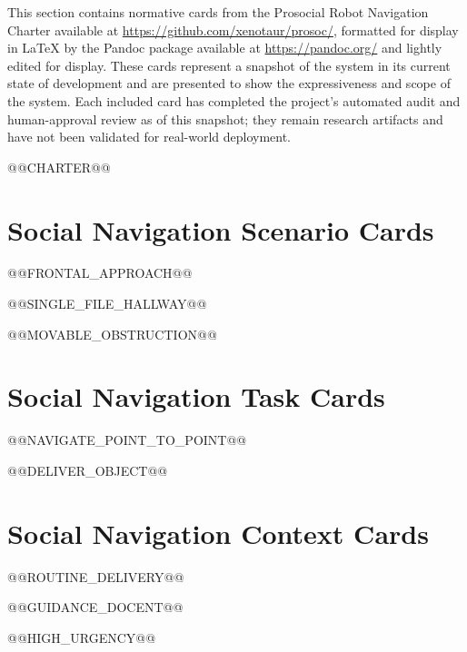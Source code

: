 \documentclass[utf8]{frontiers_suppmat} %
\begin{document}
This section contains normative cards from the Prosocial Robot Navigation Charter available at
\url{https://github.com/xenotaur/prosoc/}, formatted for display in LaTeX by the Pandoc package available at \url{https://pandoc.org/} and lightly edited for display. These cards represent a snapshot of the system in its current state of development and are presented to show the expressiveness and scope of the system. Each included card has completed the project's automated audit and human-approval review as of this snapshot; they remain research artifacts and have not been validated for real-world deployment.

@@CHARTER@@

\section{Social Navigation Scenario Cards}
@@FRONTAL_APPROACH@@

@@SINGLE_FILE_HALLWAY@@

@@MOVABLE_OBSTRUCTION@@

\section{Social Navigation Task Cards}

@@NAVIGATE_POINT_TO_POINT@@

@@DELIVER_OBJECT@@

\section{Social Navigation Context Cards}
@@ROUTINE_DELIVERY@@

@@GUIDANCE_DOCENT@@

@@HIGH_URGENCY@@


\end{document}
